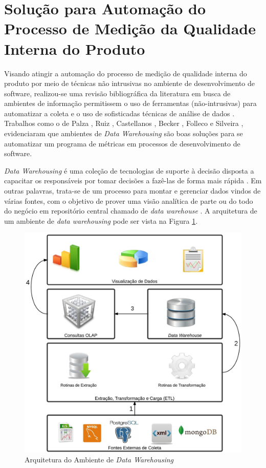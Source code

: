 \section{Solução para Automação do Processo de Medição da Qualidade Interna do Produto}
\label{sec:solucao}

Visando atingir a automação do processo de medição de qualidade interna do produto por meio de técnicas não intrusivas no ambiente de desenvolvimento de software, realizou-se uma revisão bibliográfica da literatura em busca de ambientes de informação permitissem o uso de ferramentas (não-intrusivas) para automatizar a coleta e o uso de sofisticadas técnicas de análise de dados \cite{Gopal2005} . Trabalhos como o de Palza \cite{Palza2003},  Ruiz \cite{Ruiz2005}, Castellanos \cite{Castellanos2005},  Becker \cite{Becker2006}, Folleco \cite{Folleco2007} e Silveira \cite{Silveira2010}, evidenciaram que ambientes de \textit{Data Warehousing} são boas soluções para se automatizar um programa de métricas em processos de desenvolvimento de software.

\textit{Data Warehousing} é uma coleção de tecnologias de suporte à decisão disposta a capacitar os responsáveis por tomar decisões a fazê-las de forma mais rápida \cite{chaudhuri1997} \cite{andre2000}. Em outras palavras, trata-se de um processo para montar e gerenciar dados vindos de várias fontes, com o objetivo de prover uma visão analítica de parte ou do todo do negócio em repositório central chamado de \textit{data warehouse} \cite{gardner1998} \cite{Kimball2002}. A arquitetura de um ambiente de \textit{data warehousing} pode ser vista na Figura \ref{arquitetura}. 

\begin{figure}[ht!]
\centering
\includegraphics[keepaspectratio=false,scale=0.15]{figuras/Dwing.eps}
\caption{Arquitetura do Ambiente de \textit{Data Warehousing}}
\label{arquitetura}
\end{figure}
\FloatBarrier


